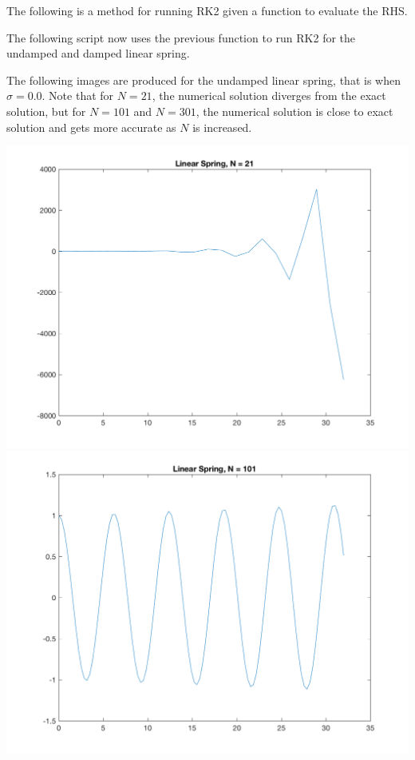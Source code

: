 \documentclass[11pt, oneside]{article}
\begin{document}
\begin{enumerate}
      The following is a method for running RK2 given a function to evaluate the RHS.\@
      

      The following script now uses the previous function to run RK2 for the
      undamped and damped linear spring.
      
      The following images are produced for the undamped linear spring, that is
      when $\sigma = 0.0$.
      Note that for $N = 21$, the numerical solution diverges from the exact solution, but
      for $N = 101$ and $N = 301$, the numerical solution is close to exact
      solution and gets more accurate as $N$ is increased.
      \begin{center}
        \includegraphics[scale=.6]{Figures/01_01.png}
        \includegraphics[scale=.6]{Figures/01_02.png}

\end{center}
\end{enumerate}
\end{document}

